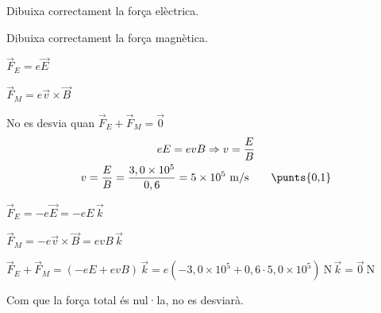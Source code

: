 \begin{solapartat}

 Dibuixa correctament la força elèctrica.

 Dibuixa correctament la força magnètica.

 $\vec{F}_E = e\vec{E}$

 $\vec{F}_M = e\vec{v}\times\vec{B}$

 No es desvia quan $\vec{F}_E + \vec{F}_M = \vec{0}$
\begin{gather*}
eE = evB \Rightarrow v = \frac{E}{B}\\
v = \frac{E}{B} = \frac{3,0\times 10^{5}}{0,6} = 5\times 10^{5}\ \mathrm{m/s} \qquad \text{\punts{0,1}}
\end{gather*}
\end{solapartat}

\begin{solapartat}

 $\vec{F}_E = -e\vec{E} = -eE\,\vec{k}$

 $\vec{F}_M = -e\vec{v}\times\vec{B} = evB\,\vec{k}$

 $\vec{F}_E + \vec{F}_M = (-eE + evB)\,\vec{k} = e\left(-3,0\times 10^{5} + 0,6\cdot 5,0\times 10^{5}\right)\ \mathrm{N}\,\vec{k} = \vec{0}\ \mathrm{N}$

 Com que la força total és nul·la, no es desviarà.
\end{solapartat}
